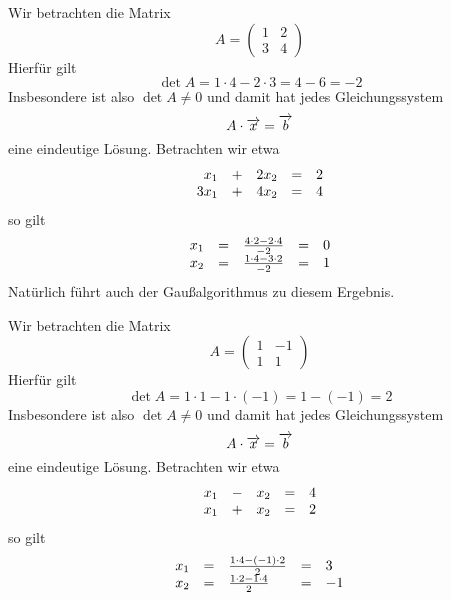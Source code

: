 \begin{beispiel} Wir betrachten die Matrix
  	$$ A = \left( \begin{matrix} 1 & 2 \\ 3 & 4  \end{matrix} \right) $$
Hierfür gilt
  	$$ \det{A} = 1 \cdot 4 - 2 \cdot 3 = 4 - 6 = -2 $$
Insbesondere ist also $\det{A} \neq 0$ und damit hat jedes Gleichungssystem 
  	$$  A  \cdot \overrightarrow{x} = \overrightarrow{b} $$ 
eine eindeutige Lösung. Betrachten wir etwa
  	$$ \begin{array} {r c l c l}
   	x_1 & + & 2 x_2 & = & 2 \\
   	3 x_1 & + & 4 x_2 & = & 4 
   	\end{array} $$
so gilt
  	$$ \begin{array} {l c l c l}
   	x_1 & = & \frac {4 \cdot 2 - 2 \cdot 4}{-2} & = & 0 \\
   	x_2 & = & \frac {1 \cdot 4 - 3 \cdot 2}{-2} & = & 1
  	\end{array} $$
Natürlich führt auch der Gaußalgorithmus zu diesem Ergebnis.
\end{beispiel}

\begin{beispiel} Wir betrachten die Matrix
  	$$ A = \left( \begin{matrix} 1 & -1 \\ 1 & 1  \end{matrix} \right) $$
Hierfür gilt
  	$$ \det{A} = 1 \cdot 1 - 1 \cdot (-1) = 1 - (-1) = 2 $$
Insbesondere ist also $\det{A} \neq 0$ und damit hat jedes Gleichungssystem 
  	$$  A  \cdot \overrightarrow{x} = \overrightarrow{b} $$ 
eine eindeutige Lösung. Betrachten wir etwa
  	$$ \begin{array} {r c l c l}
   	x_1 & - &  x_2 & = & 4 \\
   	x_1 & + &  x_2 & = & 2 
   	\end{array} $$
so gilt
  	$$ \begin{array} {l c l c l}
   	x_1 & = & \frac {1 \cdot 4 - (-1) \cdot 2}{2} & = & 3 \\
   	x_2 & = & \frac {1 \cdot 2 - 1 \cdot 4}{2} & = & -1
  	\end{array} $$
\end{beispiel}

